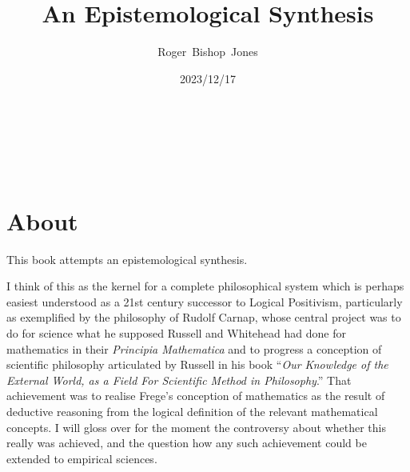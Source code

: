 \documentclass[10pt,titlepage]{book}
\title{\bf An Epistemological Synthesis}
\author{Roger~Bishop~Jones}
\date{\small 2023/12/17}
\newcommand{\ignore}[1]{}
\begin{document}
% 
                               
\begin{titlepage}
\maketitle





\end{titlepage}

\ \

\ignore{
\begin{centering}
{}
\end{centering}
}%

\setcounter{tocdepth}{2}
{\parskip-0pt\tableofcontents}


\hfill
\ 
\pagebreak







\section*{About}

This book attempts an epistemological synthesis.

I think of this as the kernel for a complete philosophical system which is perhaps easiest understood as a 21st century successor to Logical Positivism, particularly as exemplified by the philosophy of Rudolf Carnap, whose central project was to do for science what he supposed Russell and Whitehead had done for mathematics in their \emph{Principia Mathematica} \cite{russell1913} and to progress a conception of scientific philosophy articulated by Russell in his book ``\emph{Our Knowledge of the External World, as a Field For Scientific Method in Philosophy}.'' \cite{russell21}
That achievement was to realise Frege’s conception of mathematics as the result of deductive reasoning from the logical definition of the relevant mathematical concepts.  I will gloss over for the moment the controversy about whether this really was achieved, and the question how any such achievement could be extended to empirical sciences.
\end{document}

